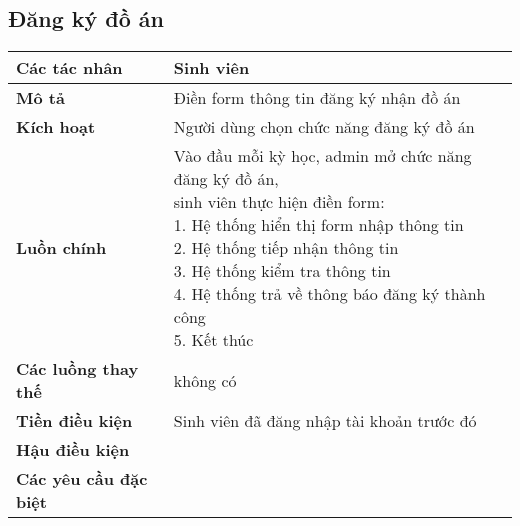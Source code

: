 	\subsection*{Đăng ký đồ án}
	\begin{tabular}{|l|p{}|}
		\hline
		\textbf{Các tác nhân}         & Sinh viên                                                                                         \\
		\hline
		\textbf{Mô tả}                & Điền form thông tin đăng ký nhận đồ án                                                            \\
		\hline
		\textbf{Kích hoạt}            & Người dùng chọn chức năng đăng ký đồ án                                                           \\
		\hline
		\textbf{Luồn chính}           & \makecell[l]{Vào đầu mỗi kỳ học, admin mở chức năng đăng ký đồ án, \\sinh viên thực hiện điền form: \\ 1. Hệ thống hiển thị form nhập thông tin \\ 2. Hệ thống tiếp nhận thông tin \\ 3. Hệ thống kiểm tra thông tin \\ 4. Hệ thống trả về thông báo đăng ký thành công \\ 5. Kết thúc} \\
		\hline
		\textbf{Các luồng thay thế}   & không có                                                                                          \\
		\hline
		\textbf{Tiền điều kiện}       & Sinh viên đã đăng nhập tài khoản trước đó                                                         \\
		\hline
		\textbf{Hậu điều kiện}        &                                                                                                   \\
		\hline
		\textbf{Các yêu cầu đặc biệt} &                                                                                                   \\
		\hline
	\end{tabular}

